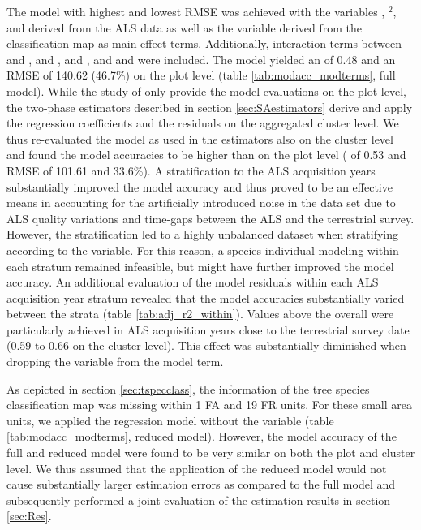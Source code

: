 The model with highest \adjrsq{} and lowest RMSE was achieved with the variables \meanheight{}, \meanheight{}$^2$, \stddev{} and \alsyear{} derived from the ALS data as well as the \treespecies{} variable derived from the classification map as main effect terms. Additionally, interaction terms between \meanheight{} and \alsyear{}, \stddev{} and \alsyear{}, \meanheight{} and \stddev{}, and \meanheight{} and \treespecies{} were included. The model yielded an \adjrsq{} of 0.48 and an RMSE of 140.62 \mha{} (46.7\%) on the plot level (table \ref{tab:modacc_modterms}, full model). While the study of \citet{hill2017a} only provide the model evaluations on the plot level, the two-phase estimators described in section \ref{sec:SAestimators} derive and apply the regression coefficients and the residuals on the aggregated cluster level. We thus re-evaluated the model as used in the estimators also on the cluster level and found the model accuracies to be higher than on the plot level (\adjrsq{} of 0.53 and RMSE of 101.61 \mha{} and 33.6\%). A stratification to the ALS acquisition years substantially improved the model accuracy and thus proved to be an effective means in accounting for the artificially introduced noise in the data set due to ALS quality variations and time-gaps between the ALS and the terrestrial survey. However, the stratification led to a highly unbalanced dataset when stratifying according to the \treespecies{} variable. For this reason, a species individual modeling within each \alsyear{} stratum remained infeasible, but might have further improved the model accuracy. An additional evaluation of the model residuals within each ALS acquisition year stratum revealed that the model accuracies substantially varied between the strata (table \ref{tab:adj_r2_within}). Values above the overall \adjrsq{} were particularly achieved in ALS acquisition years close to the terrestrial survey date (0.59 to 0.66 on the cluster level). This effect was substantially diminished when dropping the \alsyear{} variable from the model term.\par

As depicted in section \ref{sec:tspecclass}, the information of the tree species classification map was missing within 1 FA and 19 FR units. For these small area units, we applied the regression model without the \treespecies{} variable (table \ref{tab:modacc_modterms}, reduced model). However, the model accuracy of the full and reduced model were found to be very similar on both the plot and cluster level. We thus assumed that the application of the reduced model would not cause substantially larger estimation errors as compared to the full model and subsequently performed a joint evaluation of the estimation results in section \ref{sec:Res}.

